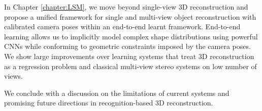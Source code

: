 \documentclass[../thesis.tex]{subfiles}
\begin{document}
In Chapter \ref{chapter:LSM}, we move beyond single-view 3D reconstruction and propose a unified framework for single and multi-view object reconstruction with calibrated camera poses within an end-to-end learnt framework. End-to-end learning allows us to implicitly model complex shape distributions using powerful CNNs while conforming to geometric constraints imposed by the camera poses. We show large improvements over learning systems that treat 3D reconstruction as a regression problem and classical multi-view stereo systems on low number of views.

We conclude with a discussion on the limitations of current systems and promising future directions in recognition-based 3D reconstruction.





\end{document}
